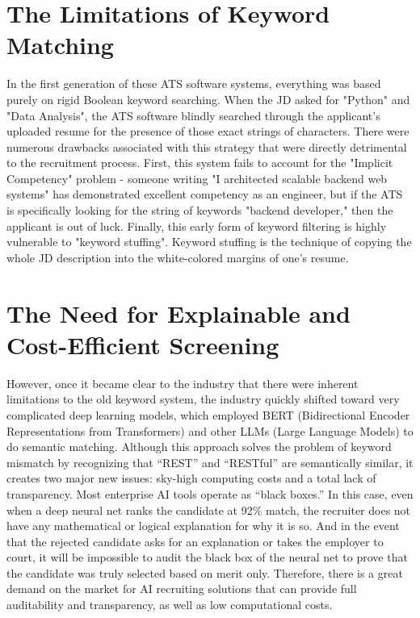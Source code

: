\section{The Limitations of Keyword Matching}
In the first generation of these ATS software systems, everything was based purely on rigid Boolean keyword searching. When the JD asked for "Python" and "Data Analysis", the ATS software blindly searched through the applicant's uploaded resume for the presence of those exact strings of characters. There were numerous drawbacks associated with this strategy that were directly detrimental to the recruitment process. First, this system fails to account for the "Implicit Competency" problem - someone writing "I architected scalable backend web systems" has demonstrated excellent competency as an engineer, but if the ATS is specifically looking for the string of keywords "backend developer," then the applicant is out of luck. Finally, this early form of keyword filtering is highly vulnerable to "keyword stuffing". Keyword stuffing is the technique of copying the whole JD description into the white-colored margins of one's resume.

\section{The Need for Explainable and Cost-Efficient Screening}
However, once it became clear to the industry that there were inherent limitations to the old keyword system, the industry quickly shifted toward very complicated deep learning models, which employed BERT (Bidirectional Encoder Representations from Transformers) and other LLMs (Large Language Models) to do semantic matching. Although this approach solves the problem of keyword mismatch by recognizing that ``REST'' and ``RESTful'' are semantically similar, it creates two major new issues: sky-high computing costs and a total lack of transparency. Most enterprise AI tools operate as ``black boxes.'' In this case, even when a deep neural net ranks the candidate at 92\% match, the recruiter does not have any mathematical or logical explanation for why it is so. And in the event that the rejected candidate asks for an explanation or takes the employer to court, it will be impossible to audit the black box of the neural net to prove that the candidate was truly selected based on merit only. Therefore, there is a great demand on the market for AI recruiting solutions that can provide full auditability and transparency, as well as low computational costs.


